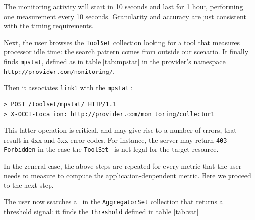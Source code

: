 \documentclass[12pt]{article}  %
\begin{document}
{The monitoring activity will start in 10 seconds and last for 1 hour, performing one measurement every 10 seconds. Granularity and accuracy are just consistent with the timing requirements.

Next, the user browses the {\tt ToolSet} collection looking for a tool that measures processor idle time: the search pattern comes from outside our scenario. It finally finds {\tt mpstat}, defined as in table \ref{tab:mpstat} in the provider's namespace {\tt http://provider.com/monitoring/}.

\begin{table}
\scriptsize
{}

\caption{Attributes defined for the {\tt mpstat} mixin \label{tab:mpstat}}
\end {table}

Then it associates {\tt link1} with the {\tt mpstat} \mi:

\begin{verbatim}
> POST /toolset/mpstat/ HTTP/1.1
> X-OCCI-Location: http://provider.com/monitoring/collector1
\end{verbatim}

This latter operation is critical, and may give rise to a number of errors, that result in 4xx and 5xx error codes. For instance, the server may return {\tt 403 Forbidden} in the case the {\tt ToolSet} \mi\ is not legal for the target resource.

In the general case, the above steps are repeated for every metric that the user needs to measure to compute the application-denpendent metric. Here we proceed to the next step. 

The user now searches a \mi\ in the {\tt AggregatorSet} collection that returns a threshold signal: it finds the {\tt Threshold} defined in table \ref{tab:vat}

}
\end{document}
